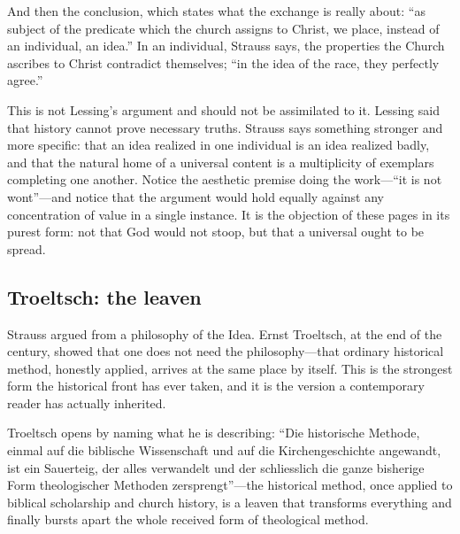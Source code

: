 And then the conclusion, which states what the exchange is really about: ``as subject of the predicate which the church assigns to Christ, we place, instead of an individual, an idea.'' In an individual, Strauss says, the properties the Church ascribes to Christ contradict themselves; ``in the idea of the race, they perfectly agree.''

This is not Lessing's argument and should not be assimilated to it. Lessing said that history cannot prove necessary truths. Strauss says something stronger and more specific: that an idea realized in one individual is an idea realized badly, and that the natural home of a universal content is a multiplicity of exemplars completing one another. Notice the aesthetic premise doing the work---``it is not wont''---and notice that the argument would hold equally against any concentration of value in a single instance. It is the objection of these pages in its purest form: not that God would not stoop, but that a universal ought to be spread.

\subsection{Troeltsch: the leaven}

Strauss argued from a philosophy of the Idea. Ernst Troeltsch, at the end of the century, showed that one does not need the philosophy---that ordinary historical method, honestly applied, arrives at the same place by itself. This is the strongest form the historical front has ever taken, and it is the version a contemporary reader has actually inherited.

Troeltsch opens by naming what he is describing: ``Die historische Methode, einmal auf die biblische Wissenschaft und auf die Kirchengeschichte angewandt, ist ein Sauerteig, der alles verwandelt und der schliesslich die ganze bisherige Form theologischer Methoden zersprengt''---the historical method, once applied to biblical scholarship and church history, is a leaven that transforms everything and finally bursts apart the whole received form of theological method.

